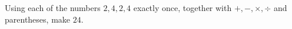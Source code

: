 Using each of the numbers $2,4,2,4$ exactly once, together with $+,-,\times,\div$ and parentheses, make $24$.
